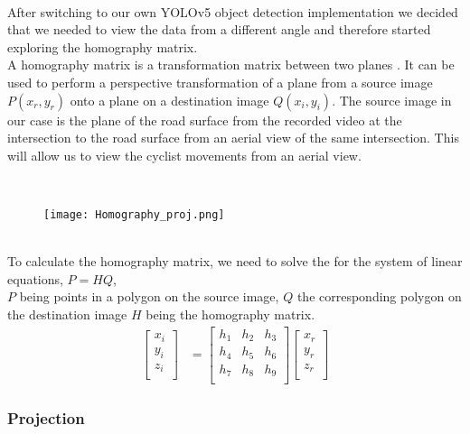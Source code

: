 \ \\
After switching to our own YOLOv5 object detection implementation we decided that we needed to view the data from a different angle and therefore
started exploring the homography matrix.
\ \\
A homography matrix is a transformation matrix between two planes \cite{hartley_zisserman_2004}. It can be used to perform a perspective transformation of a plane from a source image $P(x_r, y_r)$ onto a plane on a destination image $Q(x_i, y_i)$.
The source image in our case is the plane of the road surface from the recorded video at the intersection to the road surface from an aerial view of the same intersection. 
This will allow us to view the cyclist movements from an aerial view.

\ \\ 
\begin{figure}[h]
  \texttt{[image: Homography\_proj.png]}
  \centering 
  \end{figure}
  \label{homography}
\ \\ 
To calculate the homography matrix, we need to solve the for the system of linear equations, $P = HQ$,
\ \\
$P$ being points in a polygon on the source image, $Q$ the corresponding polygon on the destination image $H$ being the homography matrix.
\begin{align}
\label{eq:3}
  \begin{bmatrix}
    x_{i} \\
    y_{i} \\
    z_{i} \\
  \end{bmatrix}
  &= \begin{bmatrix}
      h_1 & h_2 & h_3 \\
      h_4 & h_5 & h_6 \\
      h_7 & h_8 & h_9 \\
  \end{bmatrix}
  \begin{bmatrix}
    x_{r} \\
    y_{r} \\
    z_{r} \\
  \end{bmatrix}
\end{align}

\subsubsection{Projection}


